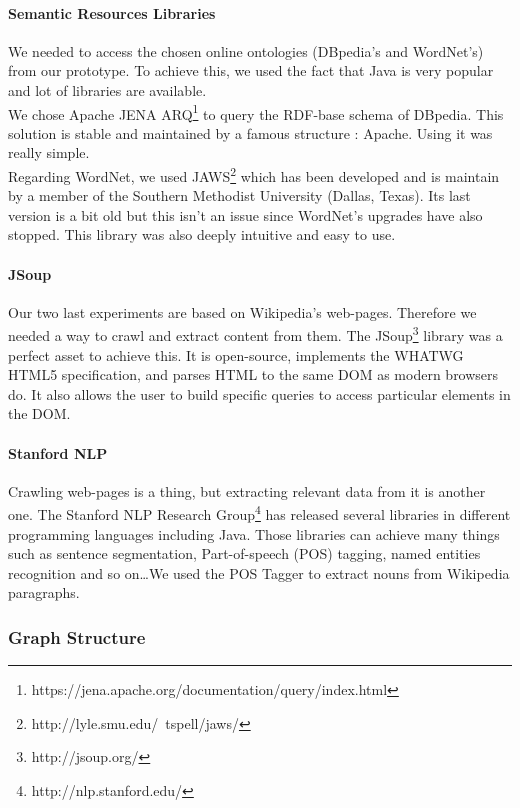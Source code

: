 \paragraph{Semantic Resources Libraries} %
\label{par:semantic_resources_libraries}
We needed to access the chosen online ontologies (DBpedia's and WordNet's) from our prototype. To achieve this, we used the fact that Java is very popular and lot of libraries are available.\\
We chose Apache JENA ARQ\footnote{https://jena.apache.org/documentation/query/index.html} to query the RDF-base schema of DBpedia. This solution is stable and maintained by a famous structure : Apache. Using it was really simple.\\
Regarding WordNet, we used JAWS\footnote{http://lyle.smu.edu/~tspell/jaws/} which has been developed and is maintain by a member of the Southern Methodist University (Dallas, Texas). Its last version is a bit old but this isn't an issue since WordNet's upgrades have also stopped. This library was also deeply intuitive and easy to use.
\paragraph{JSoup} %
\label{par:jsoup}
Our two last experiments are based on Wikipedia's web-pages. Therefore we needed a way to crawl and extract content from them. The JSoup\footnote{http://jsoup.org/} library was a perfect asset to achieve this. It is open-source, implements the WHATWG HTML5 specification, and parses HTML to the same DOM as modern browsers do. It also allows the user to build specific queries to access particular elements in the DOM.
\paragraph{Stanford NLP} %
\label{par:stanford_nlp}
Crawling web-pages is a thing, but extracting relevant data from it is another one. The Stanford NLP Research Group\footnote{http://nlp.stanford.edu/} has released several libraries in different programming languages including Java. Those libraries can achieve many things such as sentence segmentation, Part-of-speech (POS) tagging, named entities recognition and so on\dots We used the POS Tagger to extract nouns from Wikipedia paragraphs.

\subsubsection{Graph Structure} %
\label{ssub:graph_structure}
